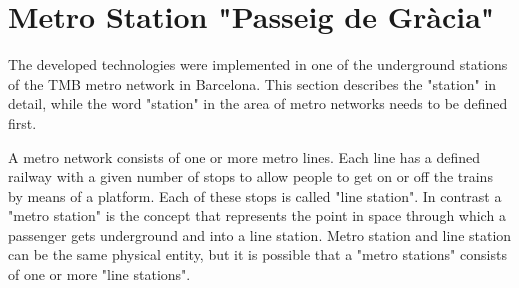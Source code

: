 
%  
%    


\section{Metro Station "Passeig de Gr\`{a}cia"}
\label{sec:station}


The developed technologies were implemented in one of the underground stations of the TMB metro network in Barcelona. This section describes the "station" in detail, while the word "station" in the area of metro networks needs to be defined first.

A metro network consists of one or more metro lines. Each line has a defined railway with a given number of stops to allow people to get on or off the trains by means of a platform. Each of these stops is called "line station". In contrast a "metro station" is the concept that represents the point in space through which a passenger gets underground and into a line station. Metro station and line station can be the same physical entity, but it is possible that a "metro stations" consists of one or more "line stations".

